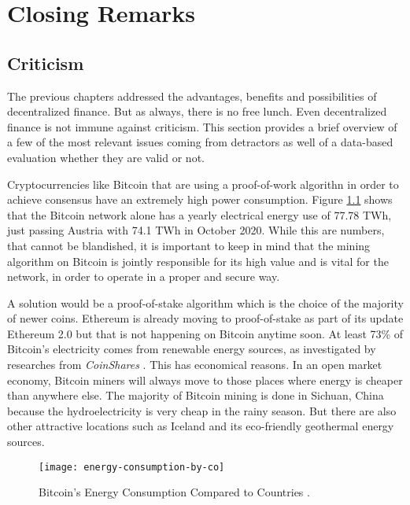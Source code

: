 \chapter{Closing Remarks}
\label{cha:ClosingRemarks}

\section{Criticism}
\label{sec:Criticism}

The previous chapters addressed the advantages, benefits and possibilities of decentralized finance. But as always, there is no free lunch.
Even decentralized finance is not immune against criticism. This section provides a brief overview of a few of the most relevant issues coming
from detractors as well of a data-based evaluation whether they are valid or not.

Cryptocurrencies like Bitcoin that are using a proof-of-work algorithn in order to achieve consensus have an extremely high power consumption.
Figure \ref{fig:BtcEnergy} shows that the Bitcoin network alone has a yearly electrical energy use of 77.78 TWh, just passing Austria with
74.1 TWh in October 2020. While this are numbers, that cannot be blandished, it is important to keep in mind that the mining algorithm on
Bitcoin is jointly responsible for its high value and is vital for the network, in order to operate in a proper and secure way.

A solution would be a proof-of-stake algorithm which is the choice of the majority of newer coins. Ethereum is already moving to proof-of-stake
as part of its update Ethereum 2.0 but that is not happening on Bitcoin anytime soon. At least 73\% of Bitcoin's electricity comes from
renewable energy sources, as investigated by researches from \textit{CoinShares} \cite[p.\ 8]{CoinShares2019}. This has economical reasons. In an open
market economy, Bitcoin miners will always move to those places where energy is cheaper than anywhere else. The majority of Bitcoin mining is
done in Sichuan, China because the hydroelectricity is very cheap in the rainy season. But there are also other attractive locations such as
Iceland and its eco-friendly geothermal energy sources.

\begin{figure}
\centering
\texttt{[image: energy-consumption-by-co]}
\caption{Bitcoin's Energy Consumption Compared to Countries \cite{Digiconomist2020}.}
\label{fig:BtcEnergy}
\end{figure}

